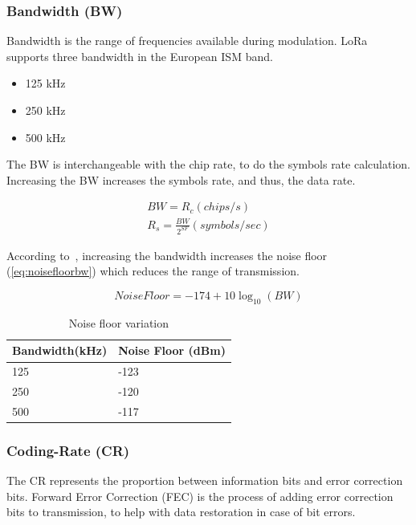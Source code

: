 \subsubsection{Bandwidth (BW)}

Bandwidth is the range of frequencies available during modulation.
LoRa supports three bandwidth in the European ISM band.

\begin{itemize}
    \item 125 kHz
    \item 250 kHz
    \item 500 kHz
\end{itemize}

The BW is interchangeable with the chip rate, to do the symbols rate
calculation.
Increasing the BW increases the symbols rate, and thus, the data rate.

\begin{gather}
 \label{eq:bw} 
  BW = R_c (chips/s) \\
  R_s = \frac{BW}{2^{SF}} (symbols / sec)
\end{gather}

According to~\cite{semtech:modulationbasics}, increasing the
bandwidth increases the noise floor (\ref{eq:noisefloorbw}) which reduces the
range of transmission.

\begin{equation}
 \label{eq:noisefloorbw} 
  Noise Floor = -174 + 10 \log_{10}(BW)
\end{equation}


\begin{table}[h!]
\centering
\begin{tabular}{@{}ll@{}}
Bandwidth(kHz) & Noise Floor (dBm) \\ \midrule
125            & -123              \\
250            & -120              \\
500            & -117              \\ \bottomrule
\end{tabular}
\caption{Noise floor variation\label{table:bw}}
\end{table}


\subsubsection{Coding-Rate (CR)}

The CR represents the proportion between information bits and error
correction bits. 
Forward Error Correction (FEC) is the process of adding error correction bits to
transmission, to help with data restoration in case of bit errors.

